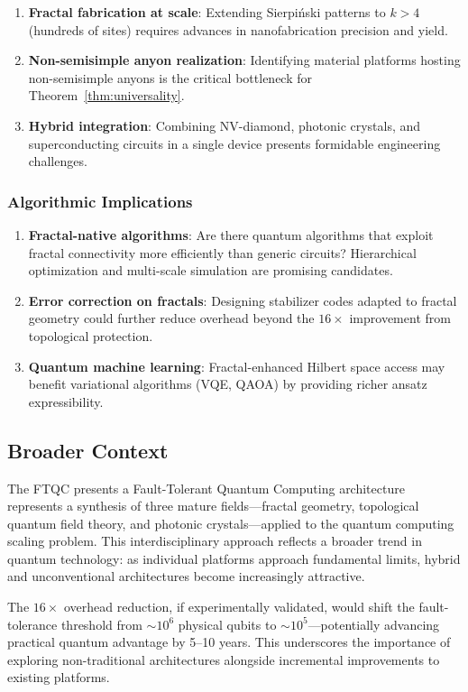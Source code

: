 \begin{enumerate}
\item \textbf{Fractal fabrication at scale}: Extending Sierpi\'{n}ski patterns to $k > 4$ (hundreds of sites) requires advances in nanofabrication precision and yield.

\item \textbf{Non-semisimple anyon realization}: Identifying material platforms hosting non-semisimple anyons is the critical bottleneck for Theorem~\ref{thm:universality}.

\item \textbf{Hybrid integration}: Combining NV-diamond, photonic crystals, and superconducting circuits in a single device presents formidable engineering challenges.
\end{enumerate}

\subsubsection{Algorithmic Implications}

\begin{enumerate}
\item \textbf{Fractal-native algorithms}: Are there quantum algorithms that exploit fractal connectivity more efficiently than generic circuits? Hierarchical optimization and multi-scale simulation are promising candidates.

\item \textbf{Error correction on fractals}: Designing stabilizer codes adapted to fractal geometry could further reduce overhead beyond the $16\times$ improvement from topological protection.

\item \textbf{Quantum machine learning}: Fractal-enhanced Hilbert space access may benefit variational algorithms (VQE, QAOA) by providing richer ansatz expressibility.
\end{enumerate}

\subsection{Broader Context}

The FTQC presents a Fault-Tolerant Quantum Computing architecture represents a synthesis of three mature fields—fractal geometry, topological quantum field theory, and photonic crystals—applied to the quantum computing scaling problem. This interdisciplinary approach reflects a broader trend in quantum technology: as individual platforms approach fundamental limits, hybrid and unconventional architectures become increasingly attractive.

The $16\times$ overhead reduction, if experimentally validated, would shift the fault-tolerance threshold from $\sim 10^6$ physical qubits to $\sim 10^5$—potentially advancing practical quantum advantage by 5--10 years. This underscores the importance of exploring non-traditional architectures alongside incremental improvements to existing platforms.